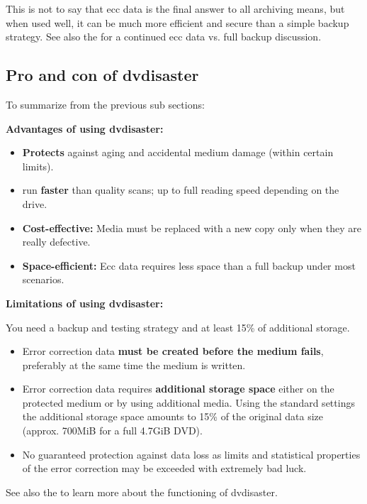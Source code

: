 \smallskip

This is not to say that ecc data is the final answer to all
archiving means, but when used well, it can be much more
efficient and secure than a simple backup strategy. See also the
 for a continued
ecc data vs. full backup discussion.

\subsection{Pro and con of dvdisaster}

To summarize from the previous sub sections:

\bigskip
{\bf Advantages of using dvdisaster:}

\begin{itemize}
\item {\bf Protects} against aging and accidental medium damage (within certain limits).
\item {} run {\bf faster} than quality scans; up to full reading speed depending on the drive.
\item {\bf Cost-effective:} Media must be replaced with a new copy only when they are really defective.
\item {\bf Space-efficient:} Ecc data requires less space than a full backup under most scenarios.
\end{itemize}

\bigskip
{\bf Limitations of using dvdisaster:}

\medskip

You need a backup and testing strategy and at least 15\% of additional storage.

\begin{itemize}
\item Error correction data {\bf must be created before the medium fails}, preferably at the same time the medium is written.
\item Error correction data requires {\bf additional storage space} either on the protected medium or by using additional media. Using the standard settings the additional storage space amounts to 15\% of the original data size (approx. 700MiB for a full 4.7GiB DVD).
\item No guaranteed protection against data loss as limits and statistical properties of the
  error correction may be exceeded with extremely bad luck.
\end{itemize}

\bigskip

See also the  to learn
more about the functioning of dvdisaster.
